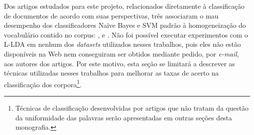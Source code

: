 


Dos artigos estudados para este projeto, relacionados diretamente à classificação de documentos de acordo com suas perspectivas, três associaram o mau desempenho dos classificadores Naïve Bayes e SVM padrão à homogeneização do vocabulário contido no corpus: \cite{malouf-taking_sides}, \cite{aaai-politics} e \cite{efron}. Não foi possível executar experimentos com o L-LDA em nenhum dos \emph{datasets} utilizados nesses trabalhos, pois eles não estão disponíveis na Web nem conseguiram ser obtidos mediante pedido, por \emph{e-mail}, aos autores dos artigos. Por este motivo, esta seção se limitará a descrever as técnicas utilizadas nesses trabalhos para melhorar as taxas de acerto na classificação dos corpora\footnote{Técnicas de classificação desenvolvidas por artigos que não tratam da questão da uniformidade das palavras serão apresentadas em outras seções desta monografia.}.

